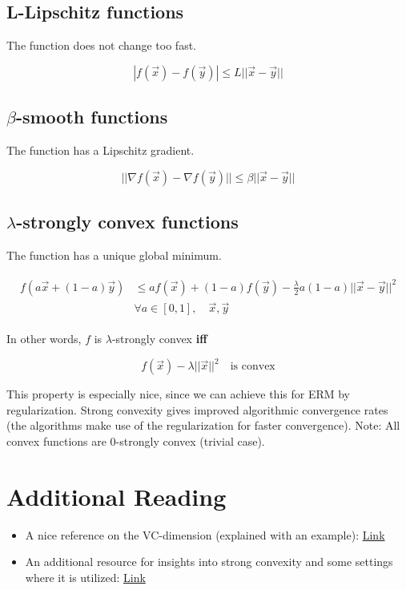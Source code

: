 \documentclass[12pt]{report}
\begin{document}
\subsection{L-Lipschitz functions}

The function does not change too fast.

\begin{equation}
|f(\vec{x}) - f(\vec{y})| \le L || \vec{x} - \vec{y} ||
\end{equation}

\subsection{$\beta$-smooth functions}

The function has a Lipschitz gradient.

\begin{equation}
|| \nabla f(\vec{x})  - \nabla f(\vec{y}) || \le \beta || \vec{x} - \vec{y} ||
\end{equation}

\subsection{$\lambda$-strongly convex functions}

The function has a unique global minimum.

\begin{align}
\begin{aligned}
f( a \vec{x} + (1-a) \vec{y} ) & \le a f(\vec{x}) + (1-a) f(\vec{y}) - \frac{\lambda}{2} a(1-a) ||\vec{x} - \vec{y}||^2  \\
& \forall a \in [0,1], \quad \vec{x}, \vec{y}
\end{aligned}
\end{align}

In other words, $f$ is $\lambda$-strongly convex \textbf{iff}

\begin{equation}
f(\vec{x}) - \lambda || \vec{x} ||^2 \quad \text{is convex}
\end{equation}

This property is especially nice, since we can achieve this for ERM by regularization. Strong convexity gives improved algorithmic convergence rates (the algorithms make use of the regularization for faster convergence). Note: All convex functions are 0-strongly convex (trivial case).

\section{Additional Reading}

\begin{itemize}
\item A nice reference on the VC-dimension (explained with an example): \href{https://www.cs.princeton.edu/courses/archive/spring13/cos511/scribe_notes/0221.pdf}{Link}
\item An additional resource for insights into strong convexity and some settings where it is utilized: 
\href{https://blogs.princeton.edu/imabandit/2013/04/04/orf523-strong-convexity/}{Link}
\end{itemize}
\end{document}
